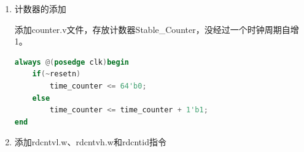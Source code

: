 \documentclass[11pt]{article}
\begin{document}
\begin{enumerate}
从每个例外对应的判断阶段开始，其和其之后的每个阶段都添加一个1位宽的用于记录该条指令是否发生该种例外的控制信号。\par
ADEF在pre-IF级进行判断，当取值地址不为4字节对齐时，产生ADEF例外，并在WB阶段把错误地址传给BADV寄存器。
\begin{lstlisting}[language=verilog]
    assign pre_if_excep_ADEF   =     pre_pc[0] | pre_pc[1];   // 记录该条指令是否存在ADEF异常
    assign pre_if_excep_en =        pre_if_excep_ADEF;
\end{lstlisting}
INE和BRK均在ID阶段判断，当发现是相应指令时产生例外。
\begin{lstlisting}[language=verilog]
// 中断,系统调用,断点，指令不存在异常处理
    assign id_excep_INT     =   has_int;        // 记录中断信号
    assign id_excep_SYSCALL =   inst_syscall;   // 记录该条指令是否存在SYSCALL异常
    assign id_excep_BRK     =   inst_break;     // 记录该条指令是否存在BRK异常
    assign id_excep_INE     =   no_inst;        // 记录该条指令是否存在INE异常
    assign id_excep_en =        id_excep_INT | id_excep_SYSCALL | id_excep_BRK | id_excep_INE | if_excep_en;         //只要有一个异常就置1
    assign id_excep_esubcode =  9'h0;
\end{lstlisting}
ALE在EX阶段判断，当取半字时地址最低位为1，或取字时地址最后两位不全为0，则产生ALE例外,并记录错误地址，等到WB阶段将其传给BADV寄存器。
\begin{lstlisting}[language=verilog]
// 地址非对齐异常处理
    assign ex_excep_ALE = (ex_op_st_ld_h & ex_alu_result[0]) | (ex_op_st_ld_w & (ex_alu_result[1] | ex_alu_result[0]));     // 记录该条指令是否存在ALE异常
    assign ex_excep_en = ex_excep_ALE | id_excep_en;
    
    assign ex_vaddr = {32{ex_read_counter && ~ex_read_counter_low}} & counter[63:32] | 
                      {32{ex_read_counter && ex_read_counter_low}}  & counter[31: 0] |
                      {32{~ex_read_counter}} & ex_alu_result;
\end{lstlisting}

\item 计数器的添加

添加counter.v文件，存放计数器Stable\_Counter，没经过一个时钟周期自增1。
\begin{lstlisting}[language=verilog]
always @(posedge clk)begin
    if(~resetn)
        time_counter <= 64'b0;
    else
        time_counter <= time_counter + 1'b1;
end
\end{lstlisting}

\item 添加rdcntvl.w、rdcntvh.w和rdcntid指令


\end{enumerate}
\end{document}
